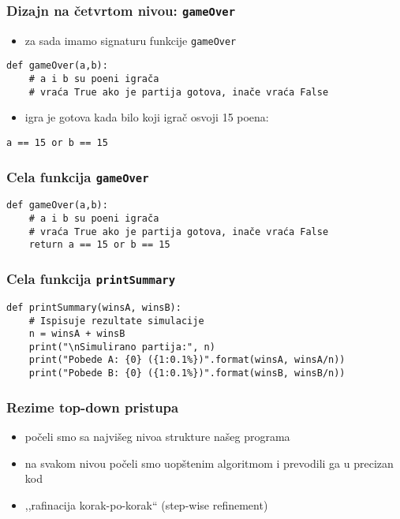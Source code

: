 \documentclass[utf8,compress,aspectratio=169]{beamer}
\begin{document}
\begin{frame}[fragile]
  \frametitle{Dizajn na četvrtom nivou: \texttt{gameOver}}
\begin{itemize}
  \item za sada imamo signaturu funkcije \texttt{gameOver}
\end{itemize}
\begin{verbatim}
def gameOver(a,b):
    # a i b su poeni igrača
    # vraća True ako je partija gotova, inače vraća False
\end{verbatim}
\begin{itemize}
  \item igra je gotova kada bilo koji igrač osvoji 15 poena:
\end{itemize}
\begin{verbatim}
a == 15 or b == 15
\end{verbatim}
\end{frame}

\begin{frame}[fragile]
  \frametitle{Cela funkcija \texttt{gameOver}}
\begin{verbatim}
def gameOver(a,b):
    # a i b su poeni igrača
    # vraća True ako je partija gotova, inače vraća False
    return a == 15 or b == 15
\end{verbatim}
\end{frame}

\begin{frame}[fragile,shrink=10]
  \frametitle{Cela funkcija \texttt{printSummary}}
\begin{verbatim}
def printSummary(winsA, winsB):
    # Ispisuje rezultate simulacije
    n = winsA + winsB
    print("\nSimulirano partija:", n)
    print("Pobede A: {0} ({1:0.1%})".format(winsA, winsA/n))
    print("Pobede B: {0} ({1:0.1%})".format(winsB, winsB/n))
\end{verbatim}
\end{frame}

\begin{frame}
  \frametitle{Rezime top-down pristupa}
\begin{itemize}
  \item počeli smo sa najvišeg nivoa strukture našeg programa
  \item na svakom nivou počeli smo uopštenim algoritmom i prevodili ga u precizan kod
  \item ,,rafinacija korak-po-korak`` (step-wise refinement)
\end{itemize}
\end{frame}
\end{document}
